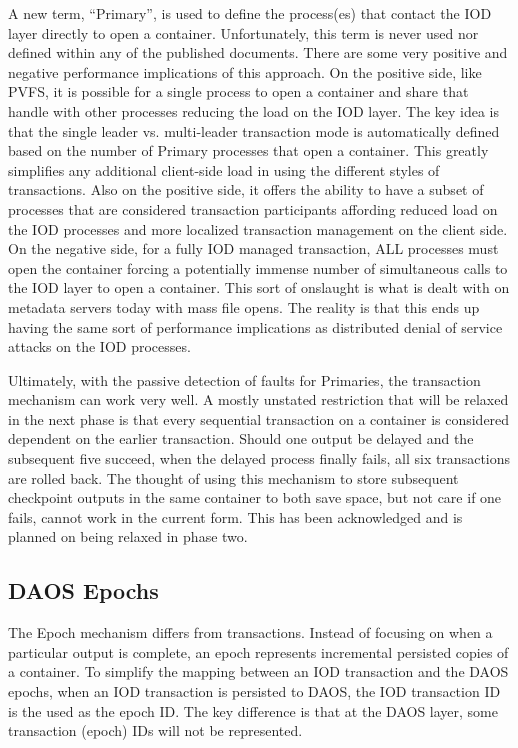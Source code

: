 \documentclass[conference]{IEEEtran}
\begin{document}
A new term, ``Primary'', is used to define the process(es) that contact the IOD
layer directly to open a container. Unfortunately, this term is never used nor
defined within any of the published documents. There are some very positive and
negative performance implications of this approach. On the positive side, like
PVFS, it is possible for a single process to open a container and share that
handle with other processes reducing the load on the IOD layer. The key idea is
that the single leader vs. multi-leader transaction mode is automatically
defined based on the number of Primary processes that open a container. This
greatly simplifies any additional client-side load in using the different
styles of transactions. Also on the positive side, it offers the ability to
have a subset of processes that are considered transaction participants
affording reduced load on the IOD processes and more localized transaction
management on the client side. On the negative side, for a fully IOD managed
transaction, ALL processes must open the container forcing a potentially
immense number of simultaneous calls to the IOD layer to open a container. This
sort of onslaught is what is dealt with on metadata servers today with mass
file opens. The reality is that this ends up having the same sort of
performance implications as distributed denial of service attacks on the IOD
processes.

Ultimately, with the passive detection of faults for Primaries, the transaction
mechanism can work very well. A mostly unstated restriction that will be
relaxed in the next phase is that every sequential transaction on a container
is considered dependent on the earlier transaction. Should one output be
delayed and the subsequent five succeed, when the delayed process finally
fails, all six transactions are rolled back. The thought of using this
mechanism to store subsequent checkpoint outputs in the same container to both
save space, but not care if one fails, cannot work in the current form. This
has been acknowledged and is planned on being relaxed in phase two.

\subsection{DAOS Epochs}
The Epoch mechanism differs from transactions. Instead of focusing on when a
particular output is complete, an epoch represents incremental persisted copies
of a container. To simplify the mapping between an IOD transaction and the DAOS
epochs, when an IOD transaction is persisted to DAOS, the IOD transaction ID is
the used as the epoch ID. The key difference is that at the DAOS layer, some
transaction (epoch) IDs will not be represented.
\end{document}
